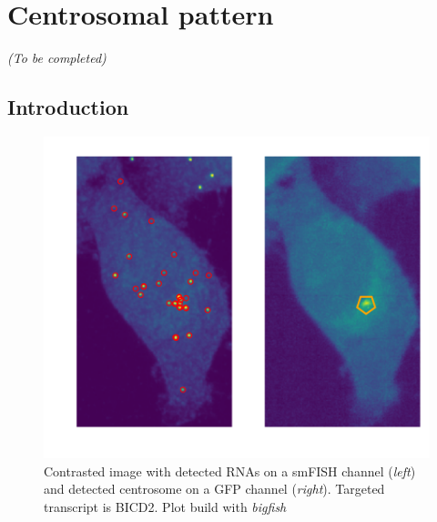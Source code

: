 

\section{Centrosomal pattern}
\label{sec:centrosomal}

\begin{center}
	\textit{(To be completed)}
\end{center}

\subsection{Introduction}
\label{subsec:introduction_centrosomal}

\begin{figure}[h]
    \centering
    \includegraphics[width=\textwidth]{figures/chapter5/centrosomes}
    \caption{Contrasted image with detected RNAs on a smFISH channel (\textit{left}) and detected centrosome on a GFP channel (\textit{right}).
	Targeted transcript is BICD2.
	Plot build with \emph{bigfish}}
    \label{fig:centrosomes}
\end{figure}

